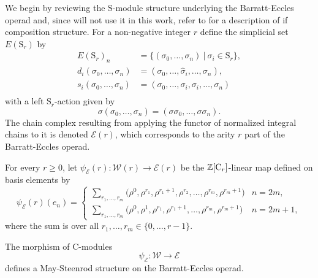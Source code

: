 We begin by reviewing the $\mathrm{S}$-module structure underlying the Barratt-Eccles operad and, since will not use it in this work, refer to \cite{berger04combinatorial} for a description of if composition structure. For a non-negative integer $r$ define the simplicial set $E(\mathrm S_r)$ by 
\begin{equation} \label{eq: milnor model of symmetric}
\begin{split}
E(\mathrm S_r)_n &= \{ (\sigma_0, \dots, \sigma_n)\ |\ \sigma_i \in \mathrm{S}_r\}, \\
d_i(\sigma_0, \dots, \sigma_n) &= (\sigma_0, \dots, \widehat{\sigma}_i, \dots, \sigma_n), \\
s_i(\sigma_0, \dots, \sigma_n) &= (\sigma_0, \dots, \sigma_i, \sigma_i, \dots, \sigma_n) \\
\end{split}
\end{equation}
with a left $\mathrm S_r$-action given by
\begin{equation*}
\sigma (\sigma_0, \dots, \sigma_n) = (\sigma \sigma_0, \dots, \sigma \sigma_n).
\end{equation*} 
The chain complex resulting from applying the functor of normalized integral chains to it is denoted $\mathcal E(r)$, which corresponds to the arity $r$ part of the Barratt-Eccles operad.

\begin{definition} \label{def: Steenrod-Adem on Barratt-Eccles}
	For every $r \geq 0$, let $\psi_{\mathcal E}(r) : \mathcal W(r) \to \mathcal E(r)$ be the $\mathbb{Z}[\mathrm{C}_r]$-linear map defined on basis elements by 
	\begin{equation*}
	\psi_{\mathcal E}(r)(e_{n}) = \begin{cases}
	\displaystyle{\sum_{r_1, \dots, r_m}} \big(\rho^0, \rho^{r_1}, \rho^{r_1+1}, \rho^{r_2}, \dots, \rho^{r_{m}}, \rho^{r_{m}+1} \big) & n = 2m, \\
	\displaystyle{\sum_{r_1, \dots, r_m}} \big(\rho^0, \rho^1, \rho^{r_1}, \rho^{r_1+1}, \dots, \rho^{r_{m}}, \rho^{r_{m}+1} \big) & n = 2m+1,
	\end{cases}
	\end{equation*}
	where the sum is over all $r_1, \dots, r_m \in \{0, \dots, r-1\}$.
\end{definition}

\begin{theorem} \label{thm: Steenrod-Adem on Barratt-Eccles}
	The morphism of $\mathrm{C}$-modules
	\begin{equation*}
	\psi_{\mathcal E} \colon \mathcal W \to \mathcal E
	\end{equation*}
	defines a May-Steenrod structure on the Barratt-Eccles operad.
\end{theorem}

